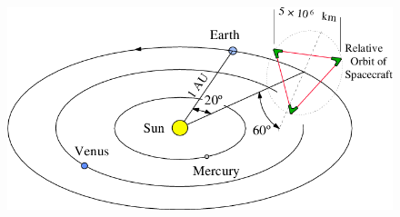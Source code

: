 \documentclass{article}
\begin{document}
\begin{figure}[]
\begin{center}
\includegraphics[width=1\columnwidth]{./figures/fig8/fig8}
\caption{ \protect}
\end{center}
\end{figure}




{}
\end{document}
